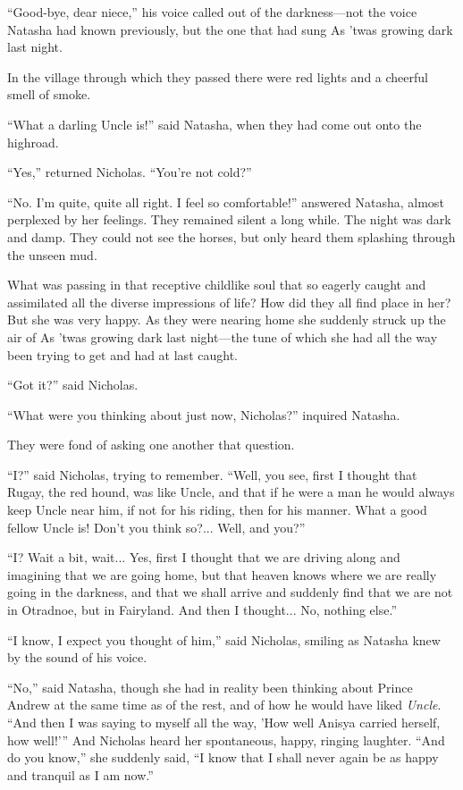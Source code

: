 ``Good-bye, dear niece,'' his voice called out of the
darkness---not the voice Natasha had known previously, but the
one that had sung As 'twas growing dark last night.

In the village through which they passed there were red lights
and a cheerful smell of smoke.

``What a darling Uncle is!'' said Natasha, when they had come out
onto the highroad.

``Yes,'' returned Nicholas. ``You're not cold?''

``No. I'm quite, quite all right. I feel so comfortable!''
answered Natasha, almost perplexed by her feelings. They remained
silent a long while. The night was dark and damp. They could not
see the horses, but only heard them splashing through the unseen
mud.

What was passing in that receptive childlike soul that so eagerly
caught and assimilated all the diverse impressions of life? How
did they all find place in her? But she was very happy. As they
were nearing home she suddenly struck up the air of As 'twas
growing dark last night---the tune of which she had all the way
been trying to get and had at last caught.

``Got it?'' said Nicholas.

``What were you thinking about just now, Nicholas?'' inquired
Natasha.

They were fond of asking one another that question.

``I?'' said Nicholas, trying to remember. ``Well, you see, first
I thought that Rugay, the red hound, was like Uncle, and that if
he were a man he would always keep Uncle near him, if not for his
riding, then for his manner. What a good fellow Uncle is! Don't
you think so?... Well, and you?''

``I? Wait a bit, wait... Yes, first I thought that we are driving
along and imagining that we are going home, but that heaven knows
where we are really going in the darkness, and that we shall
arrive and suddenly find that we are not in Otradnoe, but in
Fairyland. And then I thought... No, nothing else.''

``I know, I expect you thought of him,'' said Nicholas, smiling
as Natasha knew by the sound of his voice.

``No,'' said Natasha, though she had in reality been thinking
about Prince Andrew at the same time as of the rest, and of how
he would have liked \emph{Uncle}. ``And then I was saying to
myself all the way, 'How well Anisya carried herself, how
well!'{}'' And Nicholas heard her spontaneous, happy, ringing
laughter. ``And do you know,'' she suddenly said, ``I know that I
shall never again be as happy and tranquil as I am now.''

